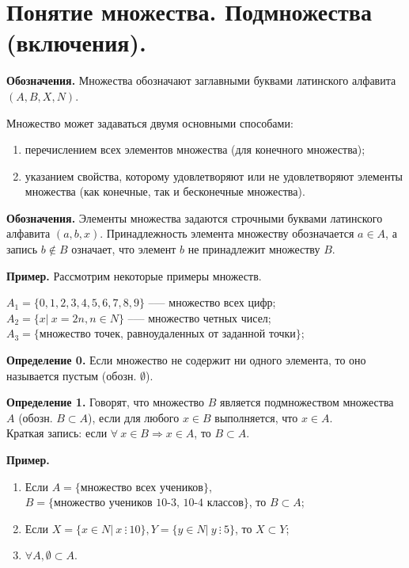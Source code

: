 \documentclass{article}
\begin{document}
    \section{Понятие множества. Подмножества (включения).}

    \textbf{Обозначения.} Множества обозначают заглавными буквами латинского алфавита $(A, B, X, N)$. 
    
    Множество может задаваться двумя основными способами: 
    
    \begin{enumerate}
        \item перечислением всех элементов множества (для конечного множества); 
        \item указанием свойства, которому удовлетворяют или не удовлетворяют элементы множества (как конечные, так и бесконечные множества). 
    \end{enumerate}
    
    \textbf{Обозначения.} Элементы множества задаются строчными буквами латинского алфавита $(a, b, x)$. Принадлежность элемента множеству обозначается $a \in A$, а запись $b \not\in B$ означает, что элемент $b$ не принадлежит множеству $B$. 

    \textbf{Пример.} Рассмотрим некоторые примеры множеств. 

    $A_1 = \{0,1,2,3,4,5,6,7,8,9\}$ --— множество всех цифр;\\
    $A_2 = \{x |\ x = 2n, n \in N\}$ --— множество четных чисел;\\ 
    $A_3= \{\textrm{множество точек, равноудаленных от заданной точки}\}$;
    
    \textbf{Определение 0.} Если множество не содержит ни одного элемента, то оно называется пустым (обозн. $\emptyset$). 
    
    \textbf{Определение 1.} Говорят, что множество $B$ является подмножеством множества $A$ (обозн. $B \subset A$), если для любого $x \in B$ выполняется, что $x \in A$.\\
    Краткая запись: если $\forall\ x \in B \Rightarrow x \in A$, то $B \subset A$. 

    \textbf{Пример.}  
    
    \begin{enumerate}
        \item Если $A = \{\textrm{множество всех учеников}\}$, $B = \{\textrm{множество учеников 10-3, 10-4 классов}\}$, то $B \subset A$;
        \item Если $X = \{ x \in N |\ x\ \vdots\ 10\}, Y = \{ y \in N |\ y\ \vdots\ 5\}$, то $X \subset Y$;
        \item $\forall A, \emptyset \subset A$. 
    \end{enumerate}
\end{document}
